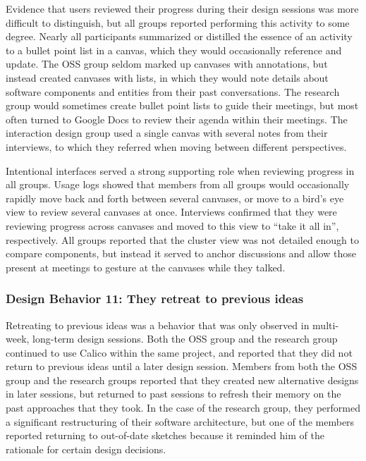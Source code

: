 Evidence that users reviewed their progress during their design sessions was more difficult to distinguish, but all groups reported performing this activity to some degree. Nearly all participants summarized or distilled the essence of an activity to a bullet point list in a canvas, which they would occasionally reference and update. The OSS group seldom marked up canvases with annotations, but instead created canvases with lists, in which they would note details about software components and entities from their past conversations. The research group would sometimes create bullet point lists to guide their meetings, but most often turned to Google Docs to review their agenda within their meetings. The interaction design group used a single canvas with several notes from their interviews, to which they referred when moving between different perspectives. 

Intentional interfaces served a strong supporting role when reviewing progress in all groups. Usage logs showed that members from all groups would occasionally rapidly move back and forth between several canvases, or move to a bird's eye view to review several canvases at once. Interviews confirmed that they were reviewing progress across canvases and moved to this view to ``take it all in'', respectively. All groups reported that the cluster view was not detailed enough to compare components, but instead it served to anchor discussions and allow those present at meetings to gesture at the canvases while they talked.

\subsubsection{Design Behavior 11: They retreat to previous ideas}

Retreating to previous ideas was a behavior that was only observed in multi-week, long-term design sessions. Both the OSS group and the research group  continued to use Calico within the same project, and reported that they did not return to previous ideas until a later design session. Members from both the OSS group and the research groups reported that they created new alternative designs in later sessions, but returned to past sessions to refresh their memory on the past approaches that they took. In the case of the research group, they performed a significant restructuring of their software architecture, but one of the members reported returning to out-of-date sketches because it reminded him of the rationale for certain design decisions.

